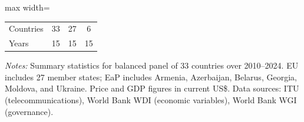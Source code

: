 \begin{table}[htbp]
\begin{threeparttable}
\begin{adjustbox}{max width=\textwidth}
\begin{tabular}{lcccccc}
Countries & \multicolumn{2}{c}{33} & \multicolumn{2}{c}{27} & \multicolumn{2}{c}{6} \\
Years & \multicolumn{2}{c}{15} & \multicolumn{2}{c}{15} & \multicolumn{2}{c}{15} \\
\bottomrule
\end{tabular}
\end{adjustbox}
\begin{tablenotes}[flushleft]
\scriptsize
\item \textit{Notes:} Summary statistics for balanced panel of 33 countries over 2010--2024. EU includes 27 member states; EaP includes Armenia, Azerbaijan, Belarus, Georgia, Moldova, and Ukraine. Price and GDP figures in current US\$. Data sources: ITU (telecommunications), World Bank WDI (economic variables), World Bank WGI (governance).
\end{tablenotes}
\end{threeparttable}
\end{table}